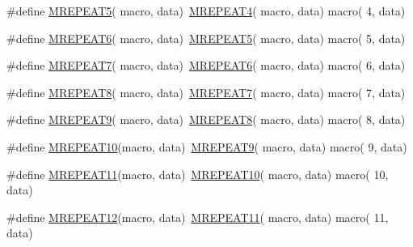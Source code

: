 \begin{DoxyCompactItemize}
\item 
\#define \mbox{\hyperlink{group__group__sam0__utils__mrepeat_gac581872cbc56cc1e30528c851a7cea40}{M\+R\+E\+P\+E\+A\+T5}}( macro,  data)~\mbox{\hyperlink{group__group__sam0__utils__mrepeat_gaf5ec86cd52c8433725c3b7d756c70a49}{M\+R\+E\+P\+E\+A\+T4}}(  macro, data)   macro(  4, data)
\item 
\#define \mbox{\hyperlink{group__group__sam0__utils__mrepeat_ga1c868616b8ea237923942783244f4512}{M\+R\+E\+P\+E\+A\+T6}}( macro,  data)~\mbox{\hyperlink{group__group__sam0__utils__mrepeat_gac581872cbc56cc1e30528c851a7cea40}{M\+R\+E\+P\+E\+A\+T5}}(  macro, data)   macro(  5, data)
\item 
\#define \mbox{\hyperlink{group__group__sam0__utils__mrepeat_ga62b2ea428fd7ac3b52107ef1e4ec984c}{M\+R\+E\+P\+E\+A\+T7}}( macro,  data)~\mbox{\hyperlink{group__group__sam0__utils__mrepeat_ga1c868616b8ea237923942783244f4512}{M\+R\+E\+P\+E\+A\+T6}}(  macro, data)   macro(  6, data)
\item 
\#define \mbox{\hyperlink{group__group__sam0__utils__mrepeat_ga2c7b24c883b7d5dc1a7623220cd63d46}{M\+R\+E\+P\+E\+A\+T8}}( macro,  data)~\mbox{\hyperlink{group__group__sam0__utils__mrepeat_ga62b2ea428fd7ac3b52107ef1e4ec984c}{M\+R\+E\+P\+E\+A\+T7}}(  macro, data)   macro(  7, data)
\item 
\#define \mbox{\hyperlink{group__group__sam0__utils__mrepeat_ga7bd045abdbb4d2c2d1d32e2d65e48b7d}{M\+R\+E\+P\+E\+A\+T9}}( macro,  data)~\mbox{\hyperlink{group__group__sam0__utils__mrepeat_ga2c7b24c883b7d5dc1a7623220cd63d46}{M\+R\+E\+P\+E\+A\+T8}}(  macro, data)   macro(  8, data)
\item 
\#define \mbox{\hyperlink{group__group__sam0__utils__mrepeat_gade8cd92280a999cf105148e3fa4c5da9}{M\+R\+E\+P\+E\+A\+T10}}(macro,  data)~\mbox{\hyperlink{group__group__sam0__utils__mrepeat_ga7bd045abdbb4d2c2d1d32e2d65e48b7d}{M\+R\+E\+P\+E\+A\+T9}}(  macro, data)   macro(  9, data)
\item 
\#define \mbox{\hyperlink{group__group__sam0__utils__mrepeat_gabd366a56c6734a5ce3ff89dc84760244}{M\+R\+E\+P\+E\+A\+T11}}(macro,  data)~\mbox{\hyperlink{group__group__sam0__utils__mrepeat_gade8cd92280a999cf105148e3fa4c5da9}{M\+R\+E\+P\+E\+A\+T10}}( macro, data)   macro( 10, data)
\item 
\#define \mbox{\hyperlink{group__group__sam0__utils__mrepeat_ga5e8405725939e1548f4c09088bb9284a}{M\+R\+E\+P\+E\+A\+T12}}(macro,  data)~\mbox{\hyperlink{group__group__sam0__utils__mrepeat_gabd366a56c6734a5ce3ff89dc84760244}{M\+R\+E\+P\+E\+A\+T11}}( macro, data)   macro( 11, data)

\end{DoxyCompactItemize}
